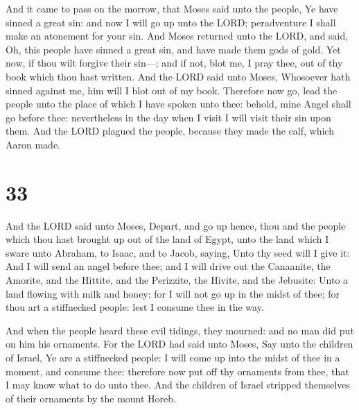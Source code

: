  And it came to pass on the morrow, that Moses said unto
the people, Ye have sinned a great sin: and now I will go up unto the
LORD; peradventure I shall make an atonement for your sin.
 And Moses returned unto the LORD, and said, Oh, this
people have sinned a great sin, and have made them gods of gold.
 Yet now, if thou wilt forgive their sin---; and if not,
blot me, I pray thee, out of thy book which thou hast written.
 And the LORD said unto Moses, Whosoever hath sinned
against me, him will I blot out of my book.  Therefore
now go, lead the people unto the place of which I have spoken unto thee:
behold, mine Angel shall go before thee: nevertheless in the day when I
visit I will visit their sin upon them.  And the LORD
plagued the people, because they made the calf, which Aaron made.

\hypertarget{section-32}{%
\section{33}\label{section-32}}

 And the LORD said unto Moses, Depart, and go up hence,
thou and the people which thou hast brought up out of the land of Egypt,
unto the land which I sware unto Abraham, to Isaac, and to Jacob,
saying, Unto thy seed will I give it:  And I will send an
angel before thee; and I will drive out the Canaanite, the Amorite, and
the Hittite, and the Perizzite, the Hivite, and the Jebusite:
 Unto a land flowing with milk and honey: for I will not
go up in the midst of thee; for thou art a stiffnecked people: lest I
consume thee in the way.

 And when the people heard these evil tidings, they
mourned: and no man did put on him his ornaments.  For the
LORD had said unto Moses, Say unto the children of Israel, Ye are a
stiffnecked people: I will come up into the midst of thee in a moment,
and consume thee: therefore now put off thy ornaments from thee, that I
may know what to do unto thee.  And the children of Israel
stripped themselves of their ornaments by the mount Horeb.

